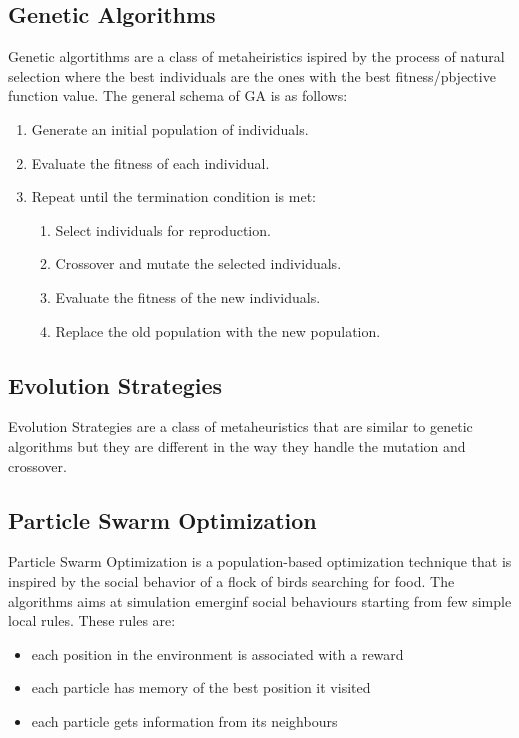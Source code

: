 \subsection{Genetic Algorithms}
Genetic algortithms are a class of metaheiristics ispired by the process of natural selection where the best individuals are the ones with the best fitness/pbjective function value. The general schema of GA is as follows:
\begin{enumerate}
    \item Generate an initial population of individuals.
    \item Evaluate the fitness of each individual.
    \item Repeat until the termination condition is met:
          \begin{enumerate}
              \item Select individuals for reproduction.
              \item Crossover and mutate the selected individuals.
              \item Evaluate the fitness of the new individuals.
              \item Replace the old population with the new population.
          \end{enumerate}
\end{enumerate}

\subsection{Evolution Strategies}
Evolution Strategies are a class of metaheuristics that are similar to genetic algorithms but they are different in the way they handle the mutation and crossover.

\subsection{Particle Swarm Optimization}
Particle Swarm Optimization is a population-based optimization technique that is inspired by the social behavior of a flock of birds searching for food. The algorithms aims at simulation emerginf social behaviours starting from few simple local rules. These rules are:
\begin{itemize}
    \item each position in the environment is associated with a reward
    \item each particle has memory of the best position it visited
    \item each particle gets information from its neighbours
\end{itemize}